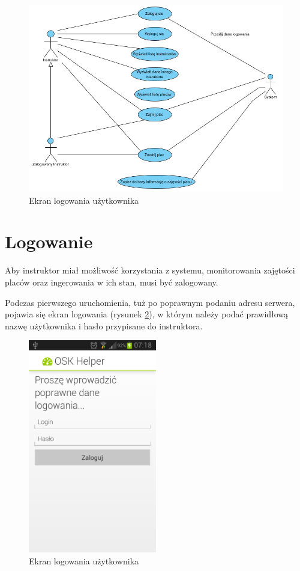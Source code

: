 \documentclass[twoside,a4paper,openright,12pt]{book}
\begin{document}
\begin{figure}[H]
\centering
\includegraphics[width=1\textwidth]{screenshots/uml/usecases.png}
\caption{Ekran logowania użytkownika}
\label{fig:Diagram przypadków użycia}
\end{figure}


\section{Logowanie}
Aby instruktor miał możliwość korzystania z systemu, monitorowania zajętości placów oraz ingerowania w ich stan, musi być zalogowany.

Podczas pierwszego uruchomienia, tuż po poprawnym podaniu adresu serwera, pojawia się ekran logowania (rysunek \ref{fig:Logowanie_mobile}), w którym należy podać prawidłową nazwę użytkownika i hasło przypisane do instruktora.

\begin{figure}[H]
\centering
\includegraphics[width=0.5\textwidth]{screenshots/android/logowanie.png}
\caption{Ekran logowania użytkownika}
\label{fig:Logowanie_mobile}
\end{figure}
\end{document}
